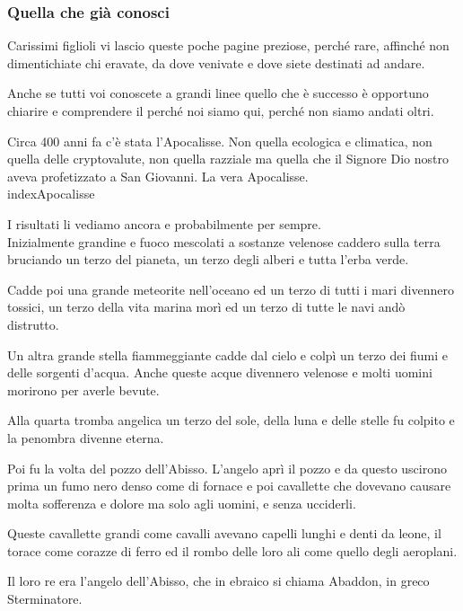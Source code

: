 \documentclass[12pt,a4paper,twoside,openany]{book}
\begin{document}
\begin{multicols}{2}
	
\subsubsection{Quella che già conosci}

Carissimi figlioli vi lascio queste poche pagine preziose, perché rare, affinché non dimentichiate chi eravate, da dove venivate e dove siete destinati ad andare.

Anche se tutti voi conoscete a grandi linee quello che è successo è opportuno chiarire e comprendere il perché noi siamo qui, perché non siamo andati oltri.

Circa 400 anni fa c'è stata l'Apocalisse. Non quella ecologica e climatica, non quella delle cryptovalute, non quella razziale ma quella che il Signore Dio nostro aveva profetizzato a San Giovanni. La vera Apocalisse.\\index{Apocalisse}

I risultati li vediamo ancora e probabilmente per sempre.\\

Inizialmente grandine e fuoco mescolati a sostanze velenose caddero sulla terra bruciando un terzo del pianeta, un terzo degli alberi e tutta l'erba verde.

Cadde poi una grande meteorite nell'oceano ed un terzo di tutti i mari divennero tossici, un terzo della vita marina morì ed un terzo di tutte le navi andò distrutto.

Un altra grande stella fiammeggiante cadde dal cielo e colpì un terzo dei fiumi e delle sorgenti d'acqua. Anche queste acque divennero velenose e molti uomini morirono per averle bevute.

Alla quarta tromba angelica un terzo del sole, della luna e delle stelle fu colpito e la penombra divenne eterna.

Poi fu la volta del pozzo dell'Abisso. L'angelo aprì il pozzo e da questo uscirono prima un fumo nero denso come di fornace e poi cavallette che dovevano causare molta sofferenza e dolore ma solo agli uomini, e senza ucciderli.

Queste cavallette grandi come cavalli avevano capelli lunghi e denti da leone, il torace come corazze di ferro ed il rombo delle loro ali come quello degli aeroplani.

Il loro re era l’angelo dell’Abisso, che in ebraico si chiama Abaddon, in greco Sterminatore.


\end{multicols}
\end{document}
